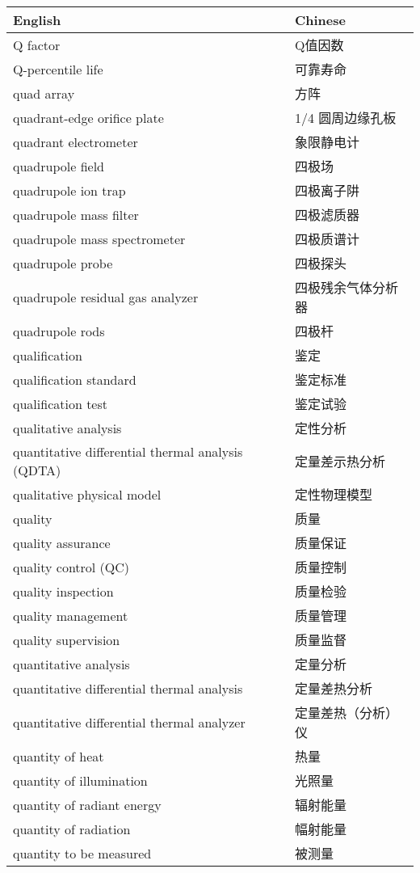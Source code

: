 \documentclass[
]{article}
\begin{document}
\begin{longtable}[]{@{}ll@{}}
\toprule()
English & Chinese \\
\midrule()
\endhead
Q factor & Q值因数 \\
Q-percentile life & 可靠寿命 \\
quad array & 方阵 \\
quadrant-edge orifice plate & 1/4 圆周边缘孔板 \\
quadrant electrometer & 象限静电计 \\
quadrupole field & 四极场 \\
quadrupole ion trap & 四极离子阱 \\
quadrupole mass filter & 四极滤质器 \\
quadrupole mass spectrometer & 四极质谱计 \\
quadrupole probe & 四极探头 \\
quadrupole residual gas analyzer & 四极残余气体分析器 \\
quadrupole rods & 四极杆 \\
qualification & 鉴定 \\
qualification standard & 鉴定标准 \\
qualification test & 鉴定试验 \\
qualitative analysis & 定性分析 \\
quantitative differential thermal analysis (QDTA) & 定量差示热分析 \\
qualitative physical model & 定性物理模型 \\
quality & 质量 \\
quality assurance & 质量保证 \\
quality control (QC) & 质量控制 \\
quality inspection & 质量检验 \\
quality management & 质量管理 \\
quality supervision & 质量监督 \\
quantitative analysis & 定量分析 \\
quantitative differential thermal analysis & 定量差热分析 \\
quantitative differential thermal analyzer & 定量差热（分析）仪 \\
quantity of heat & 热量 \\
quantity of illumination & 光照量 \\
quantity of radiant energy & 辐射能量 \\
quantity of radiation & 幅射能量 \\
quantity to be measured & 被测量 \\

\end{longtable}
\end{document}
